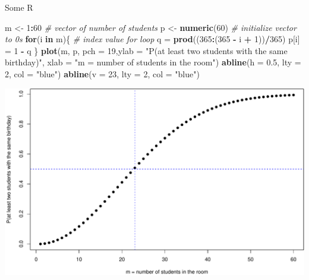 \documentclass[
  ignorenonframetext,
]{beamer}
\newenvironment{Shaded}{\begin{snugshade}}{\end{snugshade}}
\newcommand{\AttributeTok}[1]{\textcolor[rgb]{0.13,0.29,0.53}{#1}}
\newcommand{\CommentTok}[1]{\textcolor[rgb]{0.56,0.35,0.01}{\textit{#1}}}
\newcommand{\ControlFlowTok}[1]{\textcolor[rgb]{0.13,0.29,0.53}{\textbf{#1}}}
\newcommand{\DecValTok}[1]{\textcolor[rgb]{0.00,0.00,0.81}{#1}}
\newcommand{\FloatTok}[1]{\textcolor[rgb]{0.00,0.00,0.81}{#1}}
\newcommand{\FunctionTok}[1]{\textcolor[rgb]{0.13,0.29,0.53}{\textbf{#1}}}
\newcommand{\NormalTok}[1]{#1}
\newcommand{\OtherTok}[1]{\textcolor[rgb]{0.56,0.35,0.01}{#1}}
\newcommand{\SpecialCharTok}[1]{\textcolor[rgb]{0.81,0.36,0.00}{\textbf{#1}}}
\newcommand{\StringTok}[1]{\textcolor[rgb]{0.31,0.60,0.02}{#1}}
\begin{document}
\begin{frame}[fragile]{Some R}
\protect\hypertarget{some-r}{}
\scriptsize

\begin{Shaded}
\begin{Highlighting}[]
\NormalTok{m }\OtherTok{\textless{}{-}} \DecValTok{1}\SpecialCharTok{:}\DecValTok{60}             \CommentTok{\# vector of number of students}
\NormalTok{p }\OtherTok{\textless{}{-}} \FunctionTok{numeric}\NormalTok{(}\DecValTok{60}\NormalTok{)      }\CommentTok{\# initialize vector to 0\textquotesingle{}s}
\ControlFlowTok{for}\NormalTok{(i }\ControlFlowTok{in}\NormalTok{ m)\{          }\CommentTok{\# index value for loop}
\NormalTok{ q }\OtherTok{=} \FunctionTok{prod}\NormalTok{((}\DecValTok{365}\SpecialCharTok{:}\NormalTok{(}\DecValTok{365} \SpecialCharTok{{-}}\NormalTok{ i }\SpecialCharTok{+} \DecValTok{1}\NormalTok{))}\SpecialCharTok{/}\DecValTok{365}\NormalTok{)}
\NormalTok{ p[i] }\OtherTok{=} \DecValTok{1} \SpecialCharTok{{-}}\NormalTok{ q}
\NormalTok{\}}
\FunctionTok{plot}\NormalTok{(m, p, }\AttributeTok{pch =} \DecValTok{19}\NormalTok{,}\AttributeTok{ylab =} \StringTok{"P(at least two students with the same birthday)"}\NormalTok{,}
     \AttributeTok{xlab =} \StringTok{"m = number of students in the room"}\NormalTok{)}
\FunctionTok{abline}\NormalTok{(}\AttributeTok{h =} \FloatTok{0.5}\NormalTok{, }\AttributeTok{lty =} \DecValTok{2}\NormalTok{, }\AttributeTok{col =} \StringTok{"blue"}\NormalTok{)}
\FunctionTok{abline}\NormalTok{(}\AttributeTok{v =} \DecValTok{23}\NormalTok{, }\AttributeTok{lty =} \DecValTok{2}\NormalTok{, }\AttributeTok{col =} \StringTok{"blue"}\NormalTok{)}
\end{Highlighting}
\end{Shaded}

\begin{center}\includegraphics[width=0.3\linewidth,height=0.5\textheight]{Week7_Lect_files/figure-beamer/unnamed-chunk-1-1} \end{center}
\normalsize
\end{frame}
\end{document}
